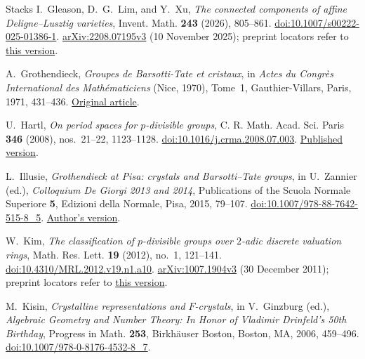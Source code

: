 \begin{thebibliography}{Stacks}
I.~Gleason, D.~G.~Lim, and Y.~Xu,
\emph{The connected components of affine Deligne--Lusztig varieties},
Invent. Math. \textbf{243} (2026), 805--861.
\href{https://doi.org/10.1007/s00222-025-01386-1}{doi:10.1007/s00222-025-01386-1}.
\href{https://arxiv.org/abs/2208.07195v3}{arXiv:2208.07195v3}
(10 November 2025); preprint locators refer to
\href{https://arxiv.org/pdf/2208.07195v3}{this version}.

A.~Grothendieck,
\emph{Groupes de Barsotti-Tate et cristaux},
in \emph{Actes du Congr\`es International des Math\'ematiciens}
(Nice, 1970), Tome~1, Gauthier-Villars, Paris, 1971, 431--436.
\href{https://webusers.imj-prg.fr/~leila.schneps/grothendieckcircle/GroupesB-T.pdf}{Original article}.

U.~Hartl,
\emph{On period spaces for $p$-divisible groups},
C. R. Math. Acad. Sci. Paris \textbf{346} (2008), nos.~21--22, 1123--1128.
\href{https://doi.org/10.1016/j.crma.2008.07.003}{doi:10.1016/j.crma.2008.07.003}.
\href{https://comptes-rendus.academie-sciences.fr/mathematique/item/10.1016/j.crma.2008.07.003.pdf}{Published version}.

L.~Illusie,
\emph{Grothendieck at Pisa: crystals and Barsotti--Tate groups},
in U.~Zannier (ed.), \emph{Colloquium De Giorgi 2013 and 2014},
Publications of the Scuola Normale Superiore \textbf{5},
Edizioni della Normale, Pisa, 2015, 79--107.
\href{https://doi.org/10.1007/978-88-7642-515-8_5}{doi:10.1007/978-88-7642-515-8\_5}.
\href{https://www.imo.universite-paris-saclay.fr/~luc.illusie/Illusie-Pisa5.pdf}{Author's version}.

W.~Kim,
\emph{The classification of $p$-divisible groups over $2$-adic discrete
valuation rings},
Math. Res. Lett. \textbf{19} (2012), no.~1, 121--141.
\href{https://doi.org/10.4310/MRL.2012.v19.n1.a10}{doi:10.4310/MRL.2012.v19.n1.a10}.
\href{https://arxiv.org/abs/1007.1904v3}{arXiv:1007.1904v3}
(30 December 2011); preprint locators refer to
\href{https://arxiv.org/pdf/1007.1904v3}{this version}.

M.~Kisin,
\emph{Crystalline representations and $F$-crystals},
in V.~Ginzburg (ed.), \emph{Algebraic Geometry and Number Theory:
In Honor of Vladimir Drinfeld's 50th Birthday},
Progress in Math. \textbf{253}, Birkh\"auser Boston, Boston, MA,
2006, 459--496.
\href{https://doi.org/10.1007/978-0-8176-4532-8_7}{doi:10.1007/978-0-8176-4532-8\_7}.


\end{thebibliography}
